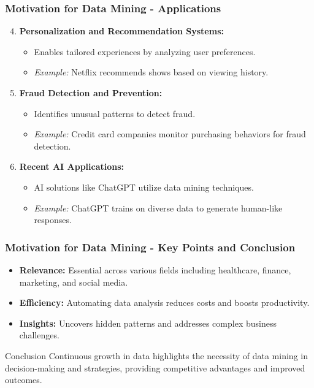 \documentclass[aspectratio=169]{beamer}
\begin{document}
\begin{frame}[fragile]
    \frametitle{Motivation for Data Mining - Applications}
    \begin{enumerate}
        \setcounter{enumi}{3}
        \item \textbf{Personalization and Recommendation Systems:}
            \begin{itemize}
                \item Enables tailored experiences by analyzing user preferences.
                \item \textit{Example:} Netflix recommends shows based on viewing history.
            \end{itemize}
        \item \textbf{Fraud Detection and Prevention:}
            \begin{itemize}
                \item Identifies unusual patterns to detect fraud.
                \item \textit{Example:} Credit card companies monitor purchasing behaviors for fraud detection.
            \end{itemize}
        \item \textbf{Recent AI Applications:}
            \begin{itemize}
                \item AI solutions like ChatGPT utilize data mining techniques.
                \item \textit{Example:} ChatGPT trains on diverse data to generate human-like responses.
            \end{itemize}
    \end{enumerate}
\end{frame}

\begin{frame}[fragile]
    \frametitle{Motivation for Data Mining - Key Points and Conclusion}
    \begin{itemize}
        \item \textbf{Relevance:} Essential across various fields including healthcare, finance, marketing, and social media.
        \item \textbf{Efficiency:} Automating data analysis reduces costs and boosts productivity.
        \item \textbf{Insights:} Uncovers hidden patterns and addresses complex business challenges.
    \end{itemize}
    \begin{block}{Conclusion}
        Continuous growth in data highlights the necessity of data mining in decision-making and strategies, providing competitive advantages and improved outcomes.
    \end{block}
\end{frame}
\end{document}
